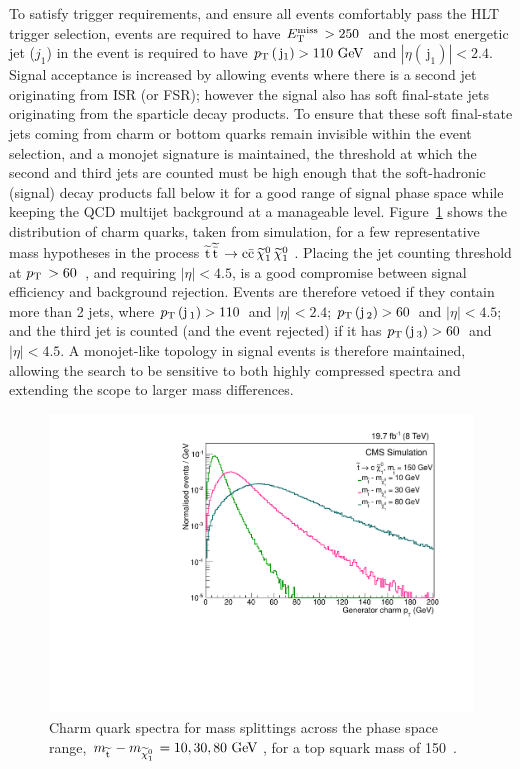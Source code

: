 To satisfy trigger requirements, and ensure all events comfortably pass the \ac{HLT} trigger selection, 
events are required to have $E_{\text{T}}^{\text{miss}}\, > 250$~\GeV and the most energetic jet ($j_1$) in the event is required 
to have $p_{\text{T}}\,(\,\mathrm{j}_1)>110~\mathrm{GeV}\,$ and $|\eta(\,\mathrm{j}_1)|<2.4$.
Signal acceptance is increased by allowing events where there is a second jet originating from \ac{ISR} (or \ac{FSR}); 
however the signal also has soft final-state jets originating from the sparticle decay products.
%
To ensure that these soft final-state jets coming from charm or bottom quarks remain invisible within the event selection,
%
and a monojet signature is maintained,
the \pt threshold at which the second and third jets are counted must be high enough that
the soft-hadronic (signal) decay products 
fall below it for a good range of signal phase space 
while keeping the QCD multijet background at a manageable level.
%
Figure~\ref{stopj2pT} shows the \pt distribution of charm quarks, taken from simulation, 
for a few representative mass hypotheses in the process $\widetilde{{\rm t}}\, \widetilde{\bar{\mathrm{t}}}\, \rightarrow \rm c \bar{\rm c}\, \widetilde{\chi}^{0}_{1}\, \widetilde{\chi}^{0}_{1}\, \,$.
%
Placing the jet counting threshold at $p_{\text{T}}\, >60$~\GeV, and requiring $|\eta| < 4.5$,
is a good compromise between signal efficiency and background rejection.
%
Events are therefore vetoed if they contain more than 2 jets,
where $p_{\text{T}}\,({\rm j}\,_{1})>110$~\GeV and $|\eta|<2.4$; $p_{\text{T}}\,({\rm j}\,_{2})>60$~\GeV and $|\eta|<4.5$; 
and the third jet is counted (and the event rejected) if it has $p_{\text{T}}\,({\rm j}\,_{3})>60$~\GeV and $|\eta|<4.5$.
A monojet-like topology in signal events is therefore maintained, 
allowing the search to be sensitive to both highly compressed spectra
and extending the scope to larger mass differences.  

\begin{figure}%
  \begin{center}
  \includegraphics[scale=0.45]{Figures/sus13009/charmpt.pdf}
  \caption{Charm quark \pt spectra for mass splittings across the phase space range, $m_{\widetilde{{\rm t}}\,}-m_{\widetilde{\chi}^{0}_{1}\,}=10, 30, 80~\mathrm{GeV}\,$, for a top squark mass of 150~\GeV.
         \label{stopj2pT}}
  \end{center}
\end{figure}




